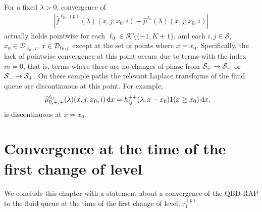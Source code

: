 \begin{rem}\label{rem: point wies}
	For a fixed \(\lambda > 0\), convergence of 
	\begin{align}
		\left|\widehat f^{\ell_0,(p)}(\lambda)(x,j;x_0,i) - \widehat \mu^{\ell_0}(\lambda)( x,j; x_0,i) \right|
	\end{align}
	actually holds pointwise for each \(\ell_0\in\mathcal K\setminus\{-1,K+1\}\), and each \(i,j\in\mathcal S,\) \(x_0\in\mathcal D_{\ell_0,i}\), \(x\in\mathcal{D}_{\ell_0,j}\) except at the set of points where \(x=x_0\). Specifically, the lack of pointwise convergence at this point occurs due to terms with the index \(m=0\), that is, terms where there are no changes of phase from \(\mathcal{S}_+\to\mathcal{S}_-\) or \(\mathcal{S}_-\to \mathcal{S}_+\). On these sample paths the relevant Laplace transforms of the fluid queue are discontinuous at this point. For example, 
	\begin{align*}
		\widehat \mu^{\ell_0}_{0,+,+}(\lambda)( x,j;x_0,i) \, \mathrm{d} x&= h_{ij}^{++}(\lambda,x-x_0)1(x\geq x_0)\, \mathrm{d} x,
	\end{align*}
	is discontinuous at \(x=x_0\). 
\end{rem}

\section{Convergence at the time of the first change of level}\label{sec: 1st change}
We conclude this chapter with a statement about a convergence of the QBD-RAP to the fluid queue at the time of the first change of level, \(\tau_1^{(p)}\). 

